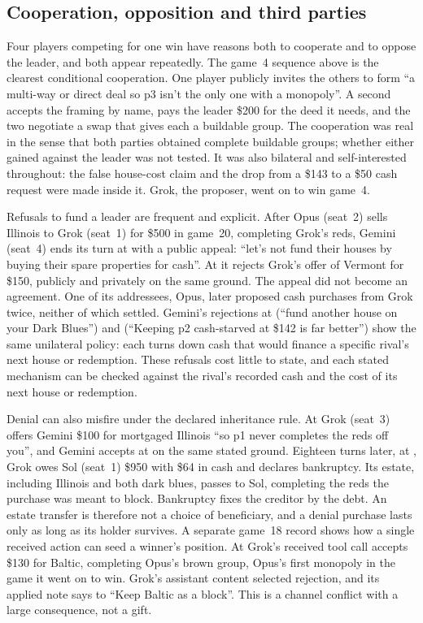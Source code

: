 \subsection{Cooperation, opposition and third parties}\label{sec:conduct-thirdparty}

Four players competing for one win have reasons both to cooperate and to oppose the leader, and both appear repeatedly. The game~4 sequence above is the clearest conditional cooperation. One player publicly invites the others to form ``a multi-way or direct deal so p3 isn't the only one with a monopoly''. A second accepts the framing by name, pays the leader \$200 for the deed it needs, and the two negotiate a swap that gives each a buildable group. The cooperation was real in the sense that both parties obtained complete buildable groups; whether either gained against the leader was not tested. It was also bilateral and self-interested throughout: the false house-cost claim and the drop from a \$143 to a \$50 cash request were made inside it. Grok, the proposer, went on to win game~4.

Refusals to fund a leader are frequent and explicit. After Opus (seat~2) sells Illinois to Grok (seat~1) for \$500 in game~20, completing Grok's reds, Gemini (seat~4) ends its turn at  with a public appeal: ``let's not fund their houses by buying their spare properties for cash''. At  it rejects Grok's offer of Vermont for \$150, publicly and privately on the same ground. The appeal did not become an agreement. One of its addressees, Opus, later proposed cash purchases from Grok twice, neither of which settled. Gemini's rejections at  (``fund another house on your Dark Blues'') and  (``Keeping p2 cash-starved at \$142 is far better'') show the same unilateral policy: each turns down cash that would finance a specific rival's next house or redemption. These refusals cost little to state, and each stated mechanism can be checked against the rival's recorded cash and the cost of its next house or redemption.

Denial can also misfire under the declared inheritance rule. At  Grok (seat~3) offers Gemini \$100 for mortgaged Illinois ``so p1 never completes the reds off you'', and Gemini accepts at  on the same stated ground. Eighteen turns later, at , Grok owes Sol (seat~1) \$950 with \$64 in cash and declares bankruptcy. Its estate, including Illinois and both dark blues, passes to Sol, completing the reds the purchase was meant to block. Bankruptcy fixes the creditor by the debt. An estate transfer is therefore not a choice of beneficiary, and a denial purchase lasts only as long as its holder survives. A separate game~18 record shows how a single received action can seed a winner's position. At  Grok's received tool call accepts \$130 for Baltic, completing Opus's brown group, Opus's first monopoly in the game it went on to win. Grok's assistant content selected rejection, and its applied note says to ``Keep Baltic as a block''. This is a channel conflict with a large consequence, not a gift.

